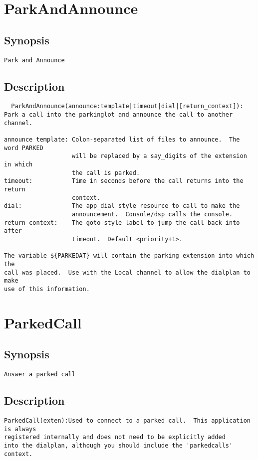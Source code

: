 \section{ParkAndAnnounce}
\subsection{Synopsis}
\begin{verbatim}
Park and Announce
\end{verbatim}
\subsection{Description}
\begin{verbatim}
  ParkAndAnnounce(announce:template|timeout|dial|[return_context]):
Park a call into the parkinglot and announce the call to another channel.

announce template: Colon-separated list of files to announce.  The word PARKED
                   will be replaced by a say_digits of the extension in which
                   the call is parked.
timeout:           Time in seconds before the call returns into the return
                   context.
dial:              The app_dial style resource to call to make the
                   announcement.  Console/dsp calls the console.
return_context:    The goto-style label to jump the call back into after
                   timeout.  Default <priority+1>.

The variable ${PARKEDAT} will contain the parking extension into which the
call was placed.  Use with the Local channel to allow the dialplan to make
use of this information.

\end{verbatim}


\section{ParkedCall}
\subsection{Synopsis}
\begin{verbatim}
Answer a parked call
\end{verbatim}
\subsection{Description}
\begin{verbatim}
ParkedCall(exten):Used to connect to a parked call.  This application is always
registered internally and does not need to be explicitly added
into the dialplan, although you should include the 'parkedcalls'
context.

\end{verbatim}


